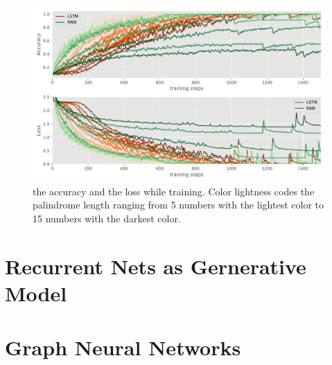 \documentclass{article}
\begin{document}
\begin{figure}\label{fig:accuracy_loss}
  \centering
  \includegraphics[width=\linewidth]{assignment_2/part1/palindrome.pdf}
  \caption{ the accuracy and  the loss while training. Color lightness codes the palindrome length ranging from 5 numbers with the lightest color to 15 numbers with the darkest color.}
\end{figure}

\section{Recurrent Nets as Gernerative Model}
\subsection{}
\subsubsection{}
\subsubsection{}
\subsubsection{}
\subsection{}

\section{Graph Neural Networks}
\subsection{}
\end{document}
